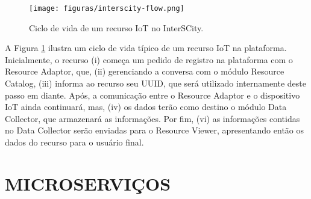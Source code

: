 \begin{figure}
  \centering
    \texttt{[image: figuras/interscity-flow.png]}
  \caption{Ciclo de vida de um recurso IoT no InterSCity.}
  \label{fig:interscity-lifecycle}
\end{figure}

A Figura \ref{fig:interscity-lifecycle} ilustra um ciclo de vida típico de um
recurso IoT na plataforma. Inicialmente, o recurso (i) começa um pedido de
registro na plataforma com o Resource Adaptor, que, (ii) gerenciando a conversa
com o módulo Resource Catalog, (iii) informa ao recurso seu UUID, que será
utilizado internamente deste passo em diante. Após, a comunicação entre o
Resource Adaptor e o dispositivo IoT ainda continuará, mas, (iv) os dados terão
como destino o módulo Data Collector, que armazenará as informações. Por fim,
(vi) as informações contidas no Data Collector serão enviadas para o
Resource Viewer, apresentando então os dados do recurso para o usuário final.

\section{MICROSERVIÇOS}

